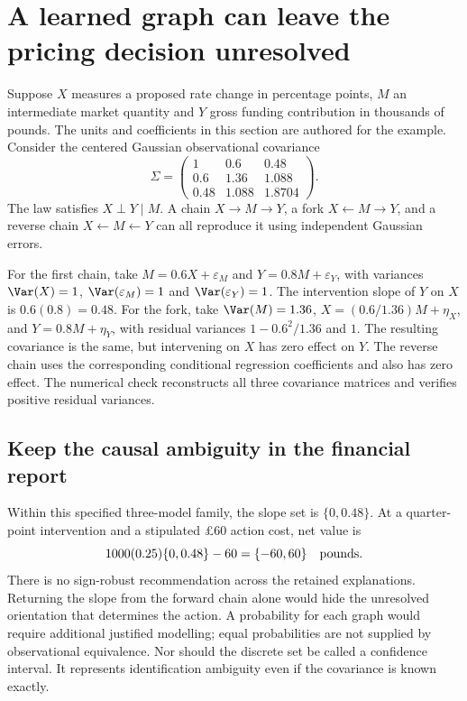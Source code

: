 \chapter{A learned graph can leave the pricing decision unresolved}
\label{rewrite:discovery}

Suppose $X$ measures a proposed rate change in percentage points, $M$ an
intermediate market quantity and $Y$ gross funding contribution in thousands
of pounds. The units and coefficients in this section are authored for the
example. Consider the centered Gaussian observational covariance
\[
 \Sigma=\begin{pmatrix}
 1&0.6&0.48\\0.6&1.36&1.088\\0.48&1.088&1.8704
 \end{pmatrix}.
\]
The law satisfies $X\perp Y\mid M$. A chain $X\to M\to Y$, a
fork $X\leftarrow M\to Y$, and a reverse chain $X\leftarrow M\leftarrow Y$
can all reproduce it using independent Gaussian errors.

For the first chain, take $M=0.6X+\varepsilon_M$ and
$Y=0.8M+\varepsilon_Y$, with variances $\Var(X)=1$,
$\Var(\varepsilon_M)=1$ and $\Var(\varepsilon_Y)=1$. The intervention
slope of $Y$ on $X$ is $0.6(0.8)=0.48$. For the fork, take
$\Var(M)=1.36$, $X=(0.6/1.36)M+\eta_X$, and $Y=0.8M+\eta_Y$,
with residual variances $1-0.6^2/1.36$ and $1$. The resulting covariance
is the same, but intervening on $X$ has zero effect on $Y$. The reverse
chain uses the corresponding conditional regression coefficients and also
has zero effect. The numerical check reconstructs all three covariance
matrices and verifies positive residual variances.

\section{Keep the causal ambiguity in the financial report}
Within this specified three-model family, the slope set is $\{0,0.48\}$.
At a quarter-point intervention and a stipulated \pounds60 action cost,
net value is
\[
 1000(0.25)\{0,0.48\}-60=\{-60,60\}
 \quad\hbox{pounds}.
\]
There is no sign-robust recommendation across the retained explanations.
Returning the slope from the forward chain alone would hide the unresolved
orientation that determines the action. A probability for each graph would
require additional justified modelling; equal probabilities are not supplied
by observational equivalence. Nor should the discrete set be called a
confidence interval. It represents identification ambiguity even if the
covariance is known exactly.

